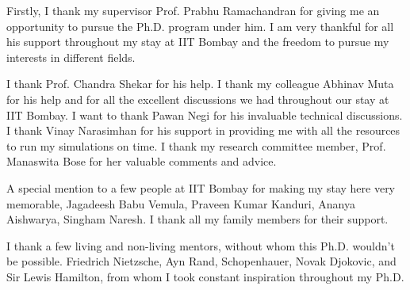 \acknowledgments


Firstly, I thank my supervisor Prof. Prabhu Ramachandran for giving me an
opportunity to pursue the Ph.D. program under him. I am very thankful for all
his support throughout my stay at IIT Bombay and the freedom to pursue my
interests in different fields.

I thank Prof. Chandra Shekar for his help. I thank my colleague Abhinav Muta for
his help and for all the excellent discussions we had throughout our stay at IIT
Bombay. I want to thank Pawan Negi for his invaluable technical discussions. I
thank Vinay Narasimhan for his support in providing me with all the resources to
run my simulations on time. I thank my research committee member, Prof. Manaswita
Bose for her valuable comments and advice.


A special mention to a few people at IIT Bombay for making my stay here very
memorable, Jagadeesh Babu Vemula, Praveen Kumar Kanduri, Ananya Aishwarya,
Singham Naresh. I thank all my family members for their support.

I thank a few living and non-living mentors, without whom this Ph.D. wouldn't be
possible. Friedrich Nietzsche, Ayn Rand, Schopenhauer, Novak Djokovic, and Sir
Lewis Hamilton, from whom I took constant inspiration throughout my Ph.D.


\signature{\today}


